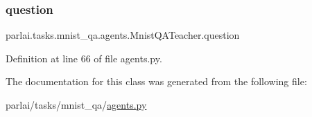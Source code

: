 \subsubsection{\texorpdfstring{question}{question}}
{\footnotesize\ttfamily parlai.\+tasks.\+mnist\+\_\+qa.\+agents.\+Mnist\+Q\+A\+Teacher.\+question}



Definition at line 66 of file agents.\+py.



The documentation for this class was generated from the following file\+:\begin{DoxyCompactItemize}
\item 
parlai/tasks/mnist\+\_\+qa/\hyperlink{parlai_2tasks_2mnist__qa_2agents_8py}{agents.\+py}\end{DoxyCompactItemize}
